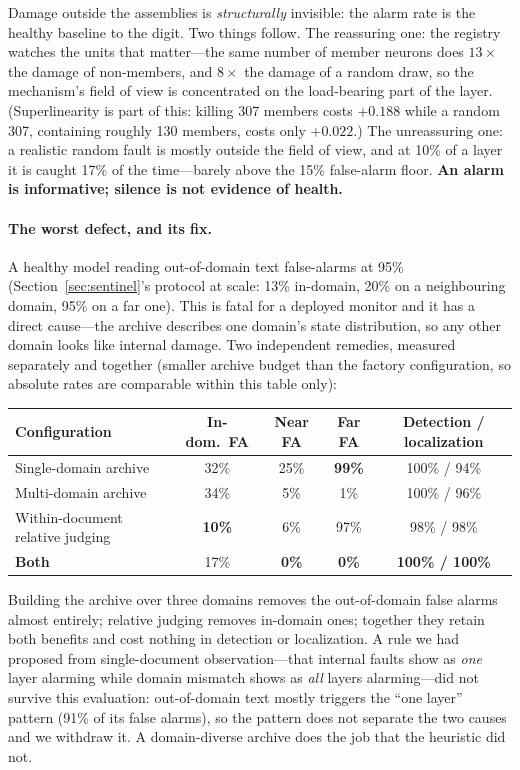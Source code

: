 \documentclass[11pt]{article}
\begin{document}
Damage outside the assemblies is \emph{structurally} invisible: the alarm rate
is the healthy baseline to the digit. Two things follow. The reassuring one:
the registry watches the units that matter---the same number of member neurons
does $13\times$ the damage of non-members, and $8\times$ the damage of a random
draw, so the mechanism's field of view is concentrated on the load-bearing
part of the layer. (Superlinearity is part of this: killing 307 members costs
$+0.188$ while a random 307, containing roughly 130 members, costs only
$+0.022$.) The unreassuring one: a realistic random fault is mostly outside the
field of view, and at 10\% of a layer it is caught 17\% of the time---barely
above the 15\% false-alarm floor. \textbf{An alarm is informative; silence is
not evidence of health.}

\paragraph{The worst defect, and its fix.} A healthy model reading
out-of-domain text false-alarms at 95\% (Section~\ref{sec:sentinel}'s protocol
at scale: 13\% in-domain, 20\% on a neighbouring domain, 95\% on a far one).
This is fatal for a deployed monitor and it has a direct cause---the archive
describes one domain's state distribution, so any other domain looks like
internal damage. Two independent remedies, measured separately and together
(smaller archive budget than the factory configuration, so absolute rates are
comparable within this table only):

\begin{center}
\small
\setlength{\tabcolsep}{5pt}
\begin{tabular}{@{}lcccc@{}}
\toprule
Configuration & In-dom.\ FA & Near FA & Far FA & Detection / localization \\
\midrule
Single-domain archive & 32\% & 25\% & \textbf{99\%} & 100\% / 94\% \\
Multi-domain archive & 34\% & 5\% & 1\% & 100\% / 96\% \\
Within-document relative judging & \textbf{10\%} & 6\% & 97\% & 98\% / 98\% \\
\textbf{Both} & 17\% & \textbf{0\%} & \textbf{0\%} & \textbf{100\% / 100\%} \\
\bottomrule
\end{tabular}
\end{center}

Building the archive over three domains removes the out-of-domain false alarms
almost entirely; relative judging removes in-domain ones; together they retain
both benefits and cost nothing in detection or localization. A rule we had
proposed from single-document observation---that internal faults show as
\emph{one} layer alarming while domain mismatch shows as \emph{all} layers
alarming---did not survive this evaluation: out-of-domain text mostly triggers
the ``one layer'' pattern (91\% of its false alarms), so the pattern does not
separate the two causes and we withdraw it. A domain-diverse archive does the
job that the heuristic did not.
\end{document}
